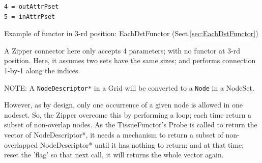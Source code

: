 \begin{itemize}
\begin{verbatim}
4 = outAttrPset
5 = inAttrPset
\end{verbatim}
Example of functor in 3-rd position: EachDstFunctor (Sect.\ref{sec:EachDstFunctor})

A Zipper connector here only accepts 4 parameters; with no functor at 3-rd
position. Here, it assumes two sets have the same sizes; and performs connection
1-by-1 along the indices. 

NOTE: A \verb!NodeDescriptor*! in a Grid will be converted to a \verb!Node! in a
NodeSet.

However, as by design, only one occurrence of a given node is allowed in one
nodeset. So, the Zipper overcome this by performing a loop; each time return a
subset of non-overlap nodes. As the TissueFunctor's Probe is called to return
the vector of NodeDescriptor*, it needs a mechanism to return a subset of
non-overlapped NodeDescriptor* until it has nothing to return; and at that time;
reset the 'flag' so that next call, it will returns the whole vector again.

\end{itemize}

